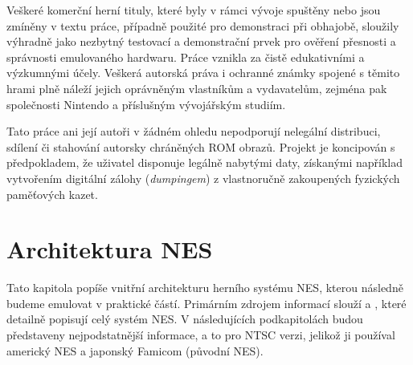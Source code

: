 \documentclass{soc}
\begin{document}
Veškeré komerční herní tituly, které byly v rámci vývoje spuštěny nebo jsou zmíněny v textu práce,
případně použité pro demonstraci při obhajobě, sloužily výhradně jako nezbytný testovací a
demonstrační prvek pro ověření přesnosti a správnosti emulovaného hardwaru. Práce vznikla za čistě
edukativními a výzkumnými účely. Veškerá autorská práva i ochranné známky spojené s těmito hrami
plně náleží jejich oprávněným vlastníkům a vydavatelům, zejména pak společnosti Nintendo a
příslušným vývojářským studiím.

Tato práce ani její autoři v žádném ohledu nepodporují nelegální distribuci, sdílení či stahování
autorsky chráněných ROM obrazů. Projekt je koncipován s předpokladem, že uživatel disponuje legálně
nabytými daty, získanými například vytvořením digitální zálohy (\textit{dumpingem}) z vlastnoručně
zakoupených fyzických paměťových kazet.

\newpage

% 
% 
% 
% 


\chapter{Architektura NES}

Tato kapitola popíše vnitřní architekturu herního systému NES, kterou následně budeme emulovat v
praktické částí. Primárním zdrojem informací slouží \cite{nesdev} a \cite{copetti-nes}, které
detailně popisují celý systém NES. V následujících podkapitolách budou představeny nejpodstatnější
informace, a to pro NTSC verzi, jelikož ji používal americký NES a japonský Famicom (původní NES).























\end{document}
